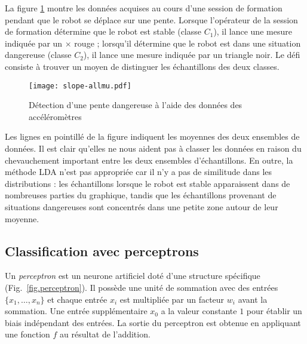 La figure \ref{fig.slopemes} montre les données acquises au cours d'une session de formation pendant que le robot se déplace sur une pente. Lorsque l'opérateur de la session de formation détermine que le robot est stable (classe $C_1$), il lance une mesure indiquée par un $\times$ rouge ; lorsqu'il détermine que le robot est dans une situation dangereuse (classe $C_2$), il lance une mesure indiquée par un triangle noir. Le défi consiste à trouver un moyen de distinguer les échantillons des deux classes.

\begin{figure}
\begin{center}
\texttt{[image: slope-allmu.pdf]}
\end{center}
\caption{Détection d'une pente dangereuse à l'aide des données des accéléromètres}\label{fig.slopemes}
\end{figure}
Les lignes en pointillé de la figure indiquent les moyennes des deux ensembles de données. Il est clair qu'elles ne nous aident pas à classer les données en raison du chevauchement important entre les deux ensembles d'échantillons. En outre, la méthode LDA n'est pas appropriée car il n'y a pas de similitude dans les distributions : les échantillons lorsque le robot est stable apparaissent dans de nombreuses parties du graphique, tandis que les échantillons provenant de situations dangereuses sont concentrés dans une petite zone autour de leur moyenne.

\subsection{Classification avec perceptrons}

Un \emph{perceptron} est un neurone artificiel doté d'une structure spécifique (Fig.~\ref{fig.perceptron}). Il possède une unité de sommation avec des entrées $\{x_1,\ldots,x_n\}$ et chaque entrée $x_i$ est multipliée par un facteur $w_i$ avant la sommation. Une entrée supplémentaire $x_0$ a la valeur constante $1$ pour établir un biais indépendant des entrées. La sortie du perceptron est obtenue en appliquant une fonction $f$ au résultat de l'addition.

